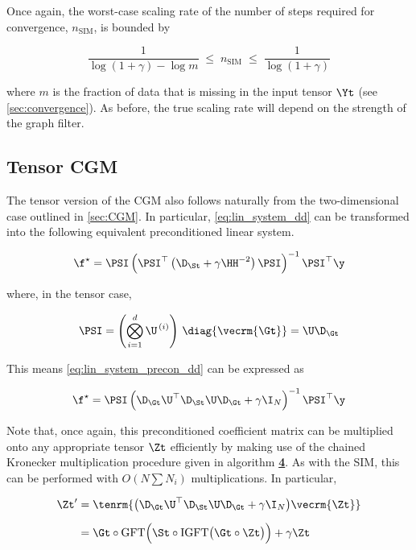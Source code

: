 Once again, the worst-case scaling rate of the number of steps required for convergence, $n_{\text{SIM}}$, is bounded by

$$
\frac{1}{\log(1 + \gamma) - \log m} \; \leq \; n_{\text{SIM}} \; \leq \; \frac{1}{\log(1 + \gamma)}
$$

where $m$ is the fraction of data that is missing in the input tensor $\Yt$ (see \cref{sec:convergence}). As before, the true scaling rate will depend on the strength of the graph filter. 

\subsection{Tensor CGM}

\label{sec:CGM_dd}

The tensor version of the CGM also follows naturally from the two-dimensional case outlined in \cref{sec:CGM}. In particular, \cref{eq:lin_system_dd} can be transformed into the following equivalent preconditioned linear system. 

\begin{equation}
    \label{eq:lin_system_precon_dd}
    \f^{\star} = \PSI \left( \PSI^\top \left(\D_\St + \gamma \HH^{-2}\right)\PSI \right)^{-1}\PSI^\top \y
\end{equation}

where, in the tensor case, 

\begin{equation}
    \PSI = \left( \bigotimes_{i=1}^d  \U^{\,(i)} \right) \, \diag{\vecrm{\Gt}} = \U \D_\Gt
\end{equation}

This means \cref{eq:lin_system_precon_dd} can be expressed as 

\begin{equation}
    \f^{\star} = \PSI \left( \D_\Gt \U^\top \D_\St \U \D_\Gt + \gamma \I_N \right)^{-1}\PSI^\top \y
\end{equation}

Note that, once again, this preconditioned coefficient matrix can be multiplied onto any appropriate tensor $\Zt$ efficiently by making use of the chained Kronecker multiplication procedure given in algorithm \hyperlink{KronMatMul}{\textbf{4}}. As with the SIM, this can be performed with $O(N \sum N_i)$ multiplications. In particular, 

\begin{align*}
    \Zt' &= \tenrm{\big( \D_\Gt \U^\top \D_\St \U \D_\Gt + \gamma \I_N \big) \vecrm{\Zt}} \\[0.2cm]
    &= \Gt \circ \text{GFT} \Big( \St \circ \text{IGFT} \big(\Gt \circ \Zt\big) \Big)  + \gamma \Zt
\end{align*}


